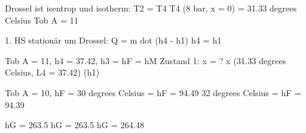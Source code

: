 Drossel ist isentrop und isotherm:  
T2 = T4  
T4 (8 bar, x = 0) = 31.33 degrees Celsius  
Tob A = 11  

1. HS stationär um Drossel:  
Q = m dot (h4 - h1)  
h4 = h1  

Tob A = 11, h4 = 37.42, h3 = hF = hM  
Zustand 1: x = ?  
x (31.33 degrees Celsius, L4 = 37.42) (h1)  

Tob A = 10, hF = 30 degrees Celsius = hF = 94.49  
32 degrees Celsius = hF = 94.39  

hG = 263.5  
hG = 263.5  
hG = 264.48